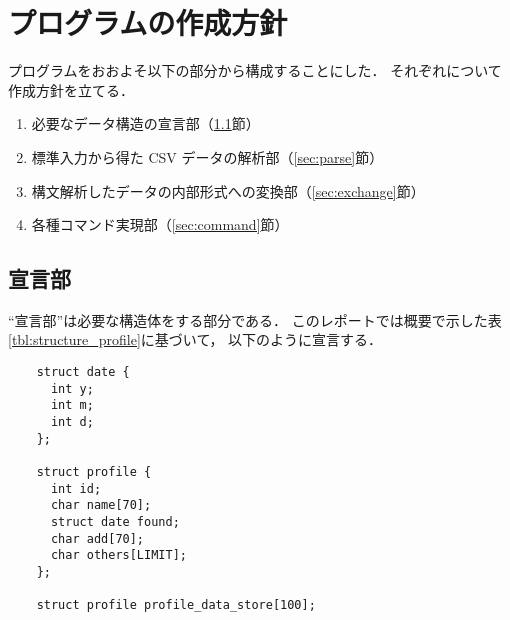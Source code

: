 \documentclass[a4j,11pt]{jarticle}
\begin{document}
\section{プログラムの作成方針}


プログラムをおおよそ以下の部分から構成することにした．
それぞれについて作成方針を立てる．

\begin{enumerate}
\setlength{\parskip}{2pt} \setlength{\itemsep}{2pt}
    \item 必要なデータ構造の宣言部（\ref{sec:declare}節）
    \item 標準入力から得た CSV データの解析部（\ref{sec:parse}節）
    \item 構文解析したデータの内部形式への変換部（\ref{sec:exchange}節）
    \item 各種コマンド実現部（\ref{sec:command}節）
\end{enumerate}


\subsection{宣言部} 
\label{sec:declare}

``宣言部''は必要な構造体をする部分である．
このレポートでは概要で示した表\ref{tbl:structure_profile}に基づいて，
以下のように宣言する．

{\fontsize{10pt}{11pt} \selectfont
\begin{verbatim}
    struct date {
      int y;
      int m;
      int d;
    };

    struct profile {
      int id;
      char name[70];
      struct date found;
      char add[70];
      char others[LIMIT];
    };

    struct profile profile_data_store[100];
\end{verbatim}
}
\end{document}
